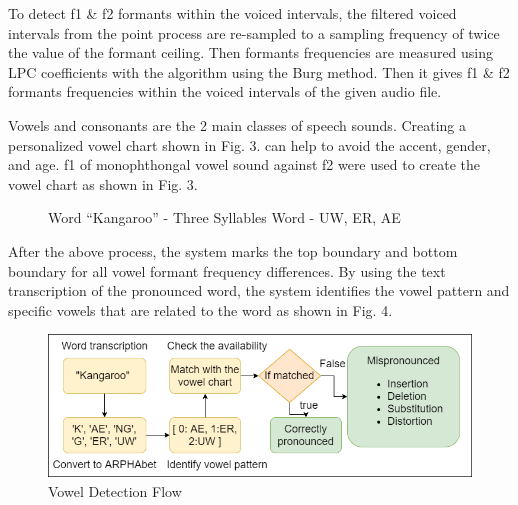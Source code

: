\documentclass[conference]{IEEEtran}
\begin{document}
To detect f1 \& f2 formants within the voiced intervals, the filtered voiced intervals from the point process are re-sampled to a sampling frequency of twice the value of the formant ceiling. Then formants frequencies are measured using LPC coefficients with the algorithm using the Burg method. Then it gives f1 \& f2 formants frequencies within the voiced intervals of the given audio file. 

Vowels and consonants are the 2 main classes of speech sounds. Creating a personalized vowel chart shown in Fig. 3. can help to avoid the accent, gender, and age. f1 of monophthongal vowel sound against f2 were used to create the vowel chart as shown in Fig. 3.

\begin{figure}[htbp]
\centerline{}
\caption{Word “Kangaroo” - Three Syllables Word - UW, ER, AE}
\end{figure}

After the above process, the system marks the top boundary and bottom boundary for all vowel formant frequency differences. By using the text transcription of the pronounced word, the system identifies the vowel pattern and specific vowels that are related to the word as shown in Fig. 4.

\begin{figure}[htbp]
\centerline{\includegraphics[scale=0.28]{it18151220_vowel_detection_flow.png}}
\caption{Vowel Detection Flow}
\end{figure}
\end{document}
